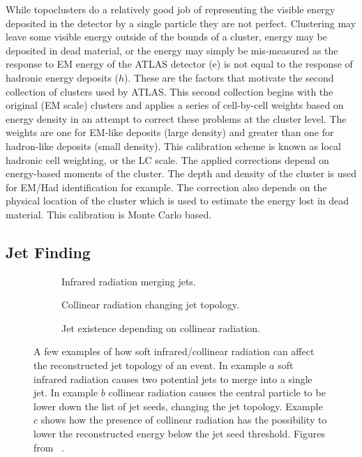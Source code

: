  
While topoclusters do a relatively good job of representing the visible energy deposited in the detector by a single particle they are not perfect.  
Clustering may leave some visible energy outside of the bounds of a cluster, energy may be deposited in dead material, or the energy may simply be mis-measured as the response to EM energy of the ATLAS detector (e) is not equal to the response of hadronic energy deposits ($h$).  
These are the factors that motivate the second collection of clusters used by ATLAS.  
This second collection begins with the original (EM scale) clusters and applies a series of cell-by-cell weights based on energy density in an attempt to correct these problems at the cluster level.  
The weights are one for EM-like deposits (large density) and greater than one for hadron-like deposits (small density).  
This calibration scheme is known as local hadronic cell weighting, or the LC scale.  
The applied corrections depend on energy-based moments of the cluster.  
The depth and density of the cluster is used for EM/Had identification for example.  
The correction also depends on the physical location of the cluster which is used to estimate the energy lost in dead material.  
This calibration is Monte Carlo based.  

\subsection{Jet Finding}
\label{Sec:JetFinding}
\begin{figure}[!ht]
 \centering
 \begin{subfigure}{.5\textwidth}
  \centering
  \caption{Infrared radiation merging jets.}
 \end{subfigure}%
 \begin{subfigure}{.5\textwidth}
  \centering
  \caption{Collinear radiation changing jet topology.}
 \end{subfigure}
 \begin{subfigure}{.5\textwidth}
  \centering
  \caption{Jet existence depending on collinear radiation.}
 \end{subfigure}
 \caption[Effect of radiation on jet building.]
  {A few examples of how soft infrared/collinear radiation can affect the reconstructed jet topology of an event.  In example $a$ soft infrared radiation causes two potential jets to merge into a single jet.  In example $b$ collinear radiation causes the central particle to be lower down the list of jet seeds, changing the jet topology.  Example $c$ shows how the presence of collinear radiation has the possibility to lower the reconstructed energy below the jet seed threshold.  Figures from ~\cite{Blazey:2000qt}. }
 \label{Fig:IRCoSafety}
\end{figure}

